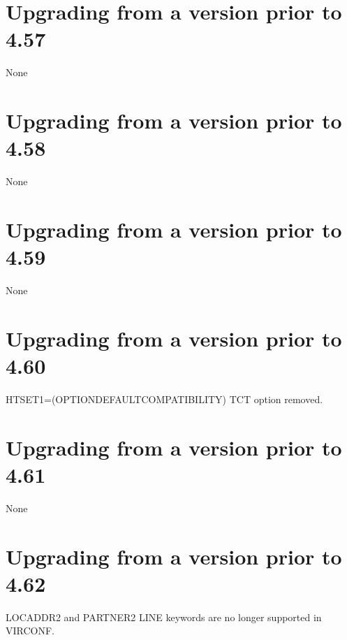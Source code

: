 \documentclass[letterpaper,10pt,english]{sphinxmanual}
\begin{document}
\ignorespaces 

\section{Upgrading from a version prior to 4.57}
\label{\detokenize{Migration_Guide:upgrading-from-a-version-prior-to-4-57}}\label{\detokenize{Migration_Guide:index-7}}
\sphinxAtStartPar
None


\section{Upgrading from a version prior to 4.58}
\label{\detokenize{Migration_Guide:upgrading-from-a-version-prior-to-4-58}}
\sphinxAtStartPar
None


\section{Upgrading from a version prior to 4.59}
\label{\detokenize{Migration_Guide:upgrading-from-a-version-prior-to-4-59}}
\sphinxAtStartPar
None


\section{Upgrading from a version prior to 4.60}
\label{\detokenize{Migration_Guide:upgrading-from-a-version-prior-to-4-60}}
\sphinxAtStartPar
HTSET1=(OPTION\sphinxhyphen{}DEFAULT\sphinxhyphen{}COMPATIBILITY) TCT option removed.


\section{Upgrading from a version prior to 4.61}
\label{\detokenize{Migration_Guide:upgrading-from-a-version-prior-to-4-61}}
\sphinxAtStartPar
None


\section{Upgrading from a version prior to 4.62}
\label{\detokenize{Migration_Guide:upgrading-from-a-version-prior-to-4-62}}
\sphinxAtStartPar
LOCADDR2 and PARTNER2 LINE keywords are no longer supported in VIRCONF.

\newpage
\end{document}
